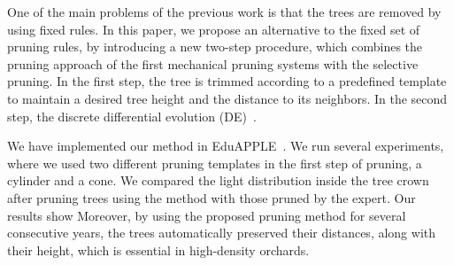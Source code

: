 One of the main problems of the previous work is that the trees are
removed by using fixed rules. 
In this paper, we propose an alternative
to the fixed set of pruning rules, by introducing a new two-step
procedure, which combines the pruning approach of the first mechanical
pruning systems with the selective pruning. In the first step, the tree
is trimmed according to a predefined template to maintain a desired
tree height and the distance to its neighbors. 
In the second step, 
the discrete differential evolution (DE)~\cite{strnad_novel_2017}. 

We have implemented our method in  EduAPPLE~\cite{kohek_eduapple:_2015}. We run several experiments,
where we used two different pruning templates in the first
step of pruning, a cylinder and a cone. 
We compared the light distribution inside the tree crown after pruning trees using the
 method with those pruned by the expert.
Our results show 
Moreover, by using the proposed pruning method for several consecutive
years,  
the trees automatically preserved their distances, along
with their height, which is essential in high-density orchards.
